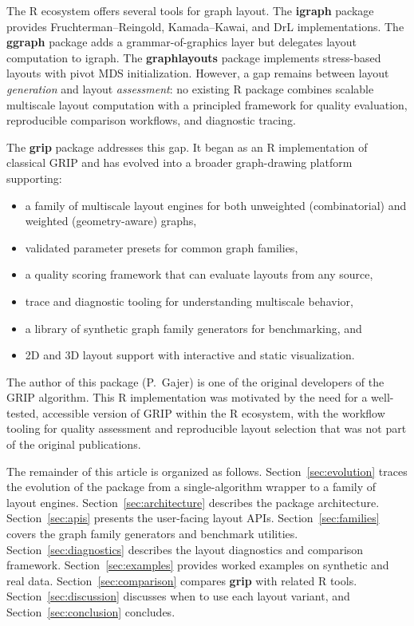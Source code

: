 The R ecosystem offers several tools for graph layout. The \textbf{igraph}
package \citep{csardi2006} provides Fruchterman--Reingold, Kamada--Kawai,
and DrL implementations. The \textbf{ggraph} package \citep{pedersen2024}
adds a grammar-of-graphics layer but delegates layout computation to
igraph. The \textbf{graphlayouts} package \citep{schoch2024} implements
stress-based layouts with pivot MDS initialization. However, a gap
remains between layout \emph{generation} and layout \emph{assessment}: no
existing R package combines scalable multiscale layout computation with a
principled framework for quality evaluation, reproducible comparison
workflows, and diagnostic tracing.

The \textbf{grip} package addresses this gap. It began as an R
implementation of classical GRIP and has evolved into a broader
graph-drawing platform supporting:
%
\begin{itemize}
\item a family of multiscale layout engines for both unweighted
  (combinatorial) and weighted (geometry-aware) graphs,
\item validated parameter presets for common graph families,
\item a quality scoring framework that can evaluate layouts from any source,
\item trace and diagnostic tooling for understanding multiscale behavior,
\item a library of synthetic graph family generators for benchmarking, and
\item 2D and 3D layout support with interactive and static visualization.
\end{itemize}

The author of this package (P.\ Gajer) is one of the original developers
of the GRIP algorithm. This R implementation was motivated by the need
for a well-tested, accessible version of GRIP within the R ecosystem,
with the workflow tooling for quality assessment and reproducible layout
selection that was not part of the original publications.

The remainder of this article is organized as follows.
Section~\ref{sec:evolution} traces the evolution of the package from
a single-algorithm wrapper to a family of layout engines.
Section~\ref{sec:architecture} describes the package architecture.
Section~\ref{sec:apis} presents the user-facing layout APIs.
Section~\ref{sec:families} covers the graph family generators and
benchmark utilities. Section~\ref{sec:diagnostics} describes the
layout diagnostics and comparison framework.
Section~\ref{sec:examples} provides worked examples on synthetic and
real data. Section~\ref{sec:comparison} compares \textbf{grip} with
related R tools. Section~\ref{sec:discussion} discusses when to use
each layout variant, and Section~\ref{sec:conclusion} concludes.


